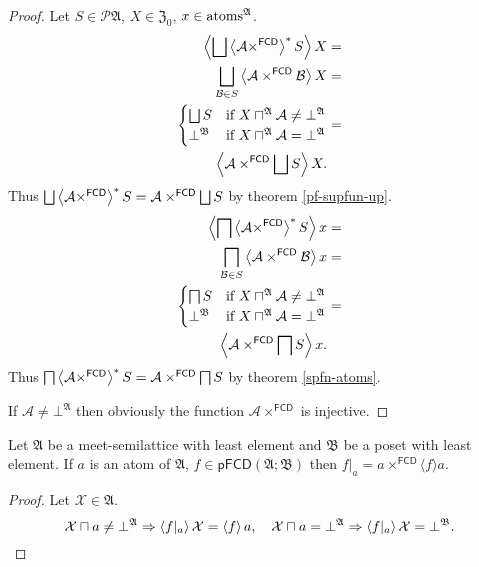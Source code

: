 \begin{proof}
Let $S\in\mathscr{P}\mathfrak{A}$, $X\in\mathfrak{Z}_{0}$, $x\in\operatorname{atoms}^{\mathfrak{A}}$.
\begin{align*}
\left\langle \bigsqcup\left\langle \mathcal{A}\times^{\mathsf{FCD}}\right\rangle ^{\ast}S\right\rangle X & =\\
\bigsqcup_{\mathcal{B}\in S}\left\langle \mathcal{A}\times^{\mathsf{FCD}}\mathcal{B}\right\rangle X & =\\
\begin{cases}
\bigsqcup S & \text{if }X\sqcap^{\mathfrak{A}}\mathcal{A}\ne\bot^{\mathfrak{A}}\\
\bot^{\mathfrak{B}} & \text{if }X\sqcap^{\mathfrak{A}}\mathcal{A}=\bot^{\mathfrak{A}}
\end{cases} & =\\
\left\langle \mathcal{A}\times^{\mathsf{FCD}}\bigsqcup S\right\rangle X.
\end{align*}
Thus $\bigsqcup\left\langle \mathcal{A}\times^{\mathsf{FCD}}\right\rangle ^{\ast}S=\mathcal{A}\times^{\mathsf{FCD}}\bigsqcup S$
by theorem \ref{pf-supfun-up}.
\begin{align*}
\left\langle \bigsqcap\left\langle \mathcal{A}\times^{\mathsf{FCD}}\right\rangle ^{\ast}S\right\rangle x & =\\
\bigsqcap_{\mathcal{B}\in S}\left\langle \mathcal{A}\times^{\mathsf{FCD}}\mathcal{B}\right\rangle x & =\\
\begin{cases}
\bigsqcap S & \text{if }X\sqcap^{\mathfrak{A}}\mathcal{A}\ne\bot^{\mathfrak{A}}\\
\bot^{\mathfrak{B}} & \text{if }X\sqcap^{\mathfrak{A}}\mathcal{A}=\bot^{\mathfrak{A}}
\end{cases} & =\\
\left\langle \mathcal{A}\times^{\mathsf{FCD}}\bigsqcap S\right\rangle x.
\end{align*}
Thus $\bigsqcap\left\langle \mathcal{A}\times^{\mathsf{FCD}}\right\rangle ^{\ast}S=\mathcal{A}\times^{\mathsf{FCD}}\bigsqcap S$
by theorem \ref{spfn-atoms}.

If $\mathcal{A}\neq\bot^{\mathfrak{A}}$ then obviously the function
$\mathcal{A}\times^{\mathsf{FCD}}$ is injective.\end{proof}
\begin{prop}
Let $\mathfrak{A}$ be a meet-semilattice with least element and $\mathfrak{B}$
be a poset with least element. If $a$ is an atom of $\mathfrak{A}$,
$f\in\mathsf{pFCD}(\mathfrak{A};\mathfrak{B})$ then $f|_{a}=a\times^{\mathsf{FCD}}\langle f\rangle a$.\end{prop}
\begin{proof}
Let $\mathcal{X}\in\mathfrak{A}$. 
\[
\mathcal{X}\sqcap a\neq\bot^{\mathfrak{A}}\Rightarrow\left\langle f|_{a}\right\rangle\mathcal{X}=\left\langle f\right\rangle a,\hspace{1em}\mathcal{X}\sqcap a=\bot^{\mathfrak{A}}\Rightarrow\left\langle f|_{a}\right\rangle\mathcal{X}=\bot^{\mathfrak{B}}.
\]
\end{proof}
